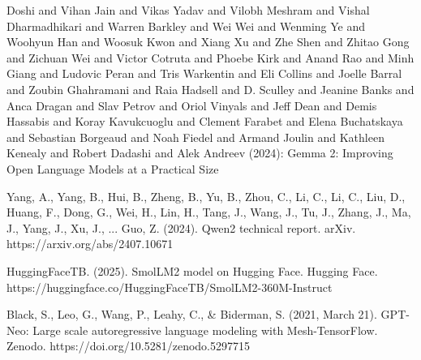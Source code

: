 \documentclass[licencjacka,en]{pracamgr}
\begin{document}
\begin{thebibliography}{99}
Doshi and Vihan Jain and Vikas Yadav and Vilobh Meshram and Vishal Dharmadhikari and Warren Barkley and Wei Wei and Wenming Ye and Woohyun Han and Woosuk Kwon and Xiang Xu and Zhe Shen and Zhitao Gong and Zichuan Wei and Victor Cotruta and Phoebe Kirk and Anand Rao and Minh Giang and Ludovic Peran and Tris Warkentin and Eli Collins and Joelle Barral and Zoubin Ghahramani and Raia Hadsell and D. Sculley and Jeanine Banks and Anca Dragan and Slav Petrov and Oriol Vinyals and Jeff Dean and Demis Hassabis and Koray Kavukcuoglu and Clement Farabet and Elena Buchatskaya and Sebastian Borgeaud and Noah Fiedel and Armand Joulin and Kathleen Kenealy and Robert Dadashi and Alek Andreev (2024): Gemma 2: Improving Open Language Models at a Practical Size

Yang, A., Yang, B., Hui, B., Zheng, B., Yu, B., Zhou, C., Li, C., Li, C., Liu, D., Huang, F., Dong, G., Wei, H., Lin, H., Tang, J., Wang, J., Tu, J., Zhang, J., Ma, J., Yang, J., Xu, J., ... Guo, Z. (2024). Qwen2 technical report. arXiv. https://arxiv.org/abs/2407.10671

HuggingFaceTB. (2025). SmolLM2 model on Hugging Face. Hugging Face. https://huggingface.co/HuggingFaceTB/SmolLM2-360M-Instruct

Black, S., Leo, G., Wang, P., Leahy, C., \& Biderman, S. (2021, March 21). GPT-Neo: Large scale autoregressive language modeling with Mesh-TensorFlow. Zenodo. https://doi.org/10.5281/zenodo.5297715


\end{thebibliography}
\end{document}
